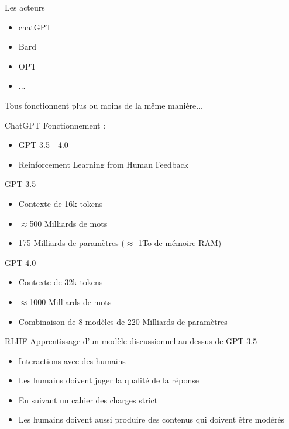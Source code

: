 \begin{frame}{Les acteurs}
  \begin{itemize}
    \item chatGPT
    \item Bard 
    \item OPT
    \item ...
  \end{itemize}
  Tous fonctionnent plus ou moins de la même manière...
\end{frame}

\begin{frame}{ChatGPT}
  Fonctionnement : 
  \begin{itemize}
    \item GPT 3.5 - 4.0
    \item Reinforcement Learning from Human Feedback
  \end{itemize}
\end{frame}

\begin{frame}{GPT 3.5}
  \begin{itemize}
    \item Contexte de 16k tokens
    \item $\approx$500 Milliards de mots
    \item 175 Milliards de paramètres ($\approx$ 1To de mémoire RAM)
  \end{itemize}
\end{frame}

\begin{frame}{GPT 4.0}
  \begin{itemize}
    \item Contexte de 32k tokens
    \item $\approx$1000 Milliards de mots
    \item Combinaison de 8 modèles de 220 Milliards de paramètres
  \end{itemize}
\end{frame}

\begin{frame}{RLHF}
  Apprentissage d'un modèle discussionnel au-dessus de GPT 3.5
  \begin{itemize}
    \item Interactions avec des humains
    \item Les humains doivent juger la qualité de la réponse
    \item En suivant un cahier des charges strict
    \item Les humains doivent aussi produire des contenus qui doivent être modérés
  \end{itemize}
\end{frame}

